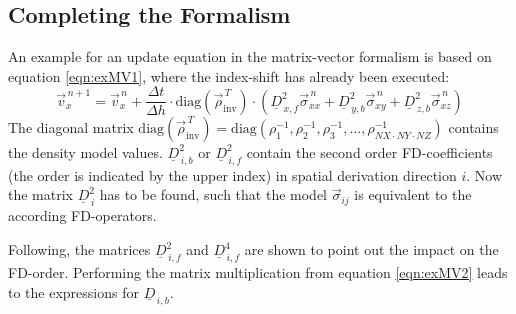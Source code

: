 \documentclass[pdftex,a4paper,parskip,listof=totoc,bibliography=totoc,onehalfspacing,12pt]{scrreprt}
\begin{document}
\subsection{Completing the Formalism}\label{sec:Mat}
An example for an update equation in the matrix-vector formalism is based on equation \ref{eqn:exMV1}, where the index-shift has already been executed:
\begin{equation}
	\vec{v}_x^{\,n+1} = \vec{v}_x^{\,n} + \frac{\Delta t}{\Delta h} \cdot \mathrm{diag} \left( \vec{\rho}_\mathrm{inv}^{\,T} \right) \cdot \left( \underline{D}_{\,x,f}^2 \vec{\sigma}_{xx}^{\,n} + \underline{D}_{\,y,b}^2 \vec{\sigma}_{xy}^{\,n} + \underline{D}_{\,z,b}^2 \vec{\sigma}_{xz}^{\,n} \right)\label{eqn:exMV2}
\end{equation}
The diagonal matrix $\mathrm{diag} \left( \vec{\rho}_\mathrm{inv}^{\,T} \right) = \mathrm{diag} \left( \rho_1^{-1}, \rho_2^{-1}, \rho_3^{-1}, \dots , \rho_{NX \cdot NY \cdot NZ}^{-1} \right)$ contains the density model values. $\underline{D}_{\,i,b}^2$ or $\underline{D}_{\,i,f}^2$ contain the second order FD-coefficients (the order is indicated by the upper index) in spatial derivation direction $i$. Now the matrix $\underline{D}_{\,i}^2$ has to be found, such that the model $\vec{\sigma}_{ij}$ is equivalent to the according FD-operators.

Following, the matrices $\underline{D}_{\,i,f}^2$ and $\underline{D}_{\,i,f}^4$ are shown to point out the impact on the FD-order. Performing the matrix multiplication from equation \ref{eqn:exMV2} leads to the expressions for $\underline{D}_{\,i,b}$.
\end{document}
